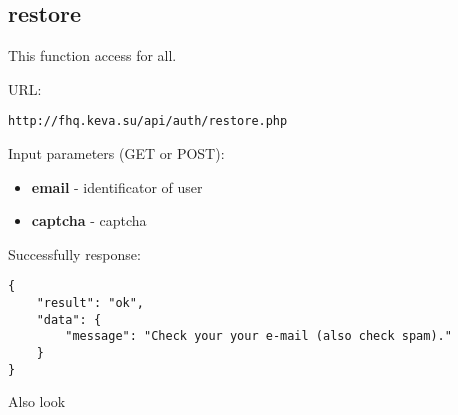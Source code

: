 \subsection{restore}
\par

This function access for all.

URL:
\begin{Verbatim}[frame=single]
http://fhq.keva.su/api/auth/restore.php
\end{Verbatim}

Input parameters (GET or POST):
\begin{itemize}
  \item \textbf{email} - identificator of user
  \item \textbf{captcha} - captcha
\end{itemize}

Successfully response:  \\
\begin{Verbatim}[frame=single]
{
    "result": "ok",
    "data": {
        "message": "Check your your e-mail (also check spam)."
    }
}
\end{Verbatim}

Also look ~
